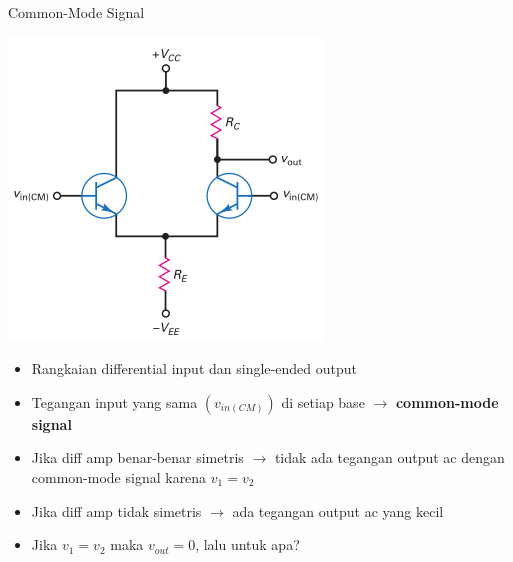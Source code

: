 \documentclass[aspectratio=169]{beamer}
\begin{document}
\begin{frame}{Common-Mode Signal}
	\begin{multicols}{2}
		\begin{center}
			\includegraphics[height=0.7\textheight]{gambar/01.diff-amp/01.common-mode_input_signal}
		\end{center}
		\columnbreak
		\begin{itemize}
			\item Rangkaian differential input dan single-ended output
			\item Tegangan input yang sama $( v_{in(CM)} )$ di setiap base $ \rightarrow $ \textbf{common-mode signal}
			\item Jika diff amp benar-benar simetris $ \rightarrow $ tidak ada tegangan output ac dengan common-mode signal karena $ v_1 = v_2 $
			\item Jika diff amp tidak simetris $ \rightarrow $ ada tegangan output ac yang kecil
			\item Jika $ v_1 = v_2 $ maka $ v_{out} = 0 $, lalu untuk apa?
		\end{itemize}
	\end{multicols}
\end{frame}
\end{document}
